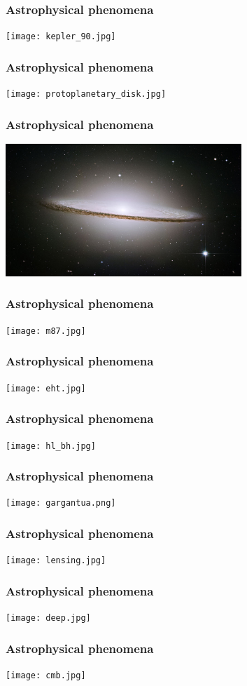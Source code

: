 \documentclass{beamer}
\begin{document}
\begin{frame}
  \center
  \frametitle{Astrophysical phenomena}
  \texttt{[image: kepler\_90.jpg]}
\end{frame}

\begin{frame}
  \center
  \frametitle{Astrophysical phenomena}
  \texttt{[image: protoplanetary\_disk.jpg]}
\end{frame}

\begin{frame}
  \center
  \frametitle{Astrophysical phenomena}
  \includegraphics[height=5cm]{sombrero.jpg}
\end{frame}

\begin{frame}
  \center
  \frametitle{Astrophysical phenomena}
  \texttt{[image: m87.jpg]}
\end{frame}

\begin{frame}
  \center
  \frametitle{Astrophysical phenomena}
  \texttt{[image: eht.jpg]}
\end{frame}

\begin{frame}
  \center
  \frametitle{Astrophysical phenomena}
  \texttt{[image: hl\_bh.jpg]}
\end{frame}

\begin{frame}
  \center
  \frametitle{Astrophysical phenomena}
  \texttt{[image: gargantua.png]}
\end{frame}

\begin{frame}
  \center
  \frametitle{Astrophysical phenomena}
  \texttt{[image: lensing.jpg]}
\end{frame}

\begin{frame}
  \center
  \frametitle{Astrophysical phenomena}
  \texttt{[image: deep.jpg]}
\end{frame}

\begin{frame}
  \center
  \frametitle{Astrophysical phenomena}
  \texttt{[image: cmb.jpg]}
\end{frame}
\end{document}
